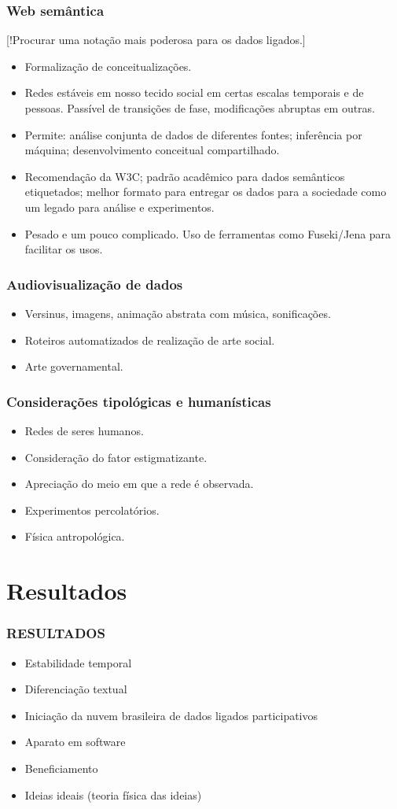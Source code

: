 \documentclass[10pt]{beamer}
\begin{document}
\begin{frame}
\frametitle{Web semântica}
[!Procurar uma notação mais poderosa para os dados ligados.]
\begin{itemize}
	\item Formalização de conceitualizações.
	\item Redes estáveis em nosso tecido social em certas escalas temporais e de pessoas.
		Passível de transições de fase, modificações abruptas em outras.
	\item Permite: análise conjunta de dados de diferentes fontes; inferência por máquina; desenvolvimento conceitual compartilhado.
	\item Recomendação da W3C; padrão acadêmico para dados semânticos etiquetados; melhor formato para entregar os dados para a sociedade como um legado para análise e experimentos.
	\item Pesado e um pouco complicado. Uso de ferramentas como Fuseki/Jena para facilitar os usos.
\end{itemize}

\end{frame}
\begin{frame}
\frametitle{Audiovisualização de dados}
\begin{itemize}
	\item Versinus, imagens, animação abstrata com música, sonificações.
	\item Roteiros automatizados de realização de arte social.
	\item Arte governamental.
\end{itemize}
\end{frame}

\begin{frame}
\frametitle{Considerações tipológicas e humanísticas}
\begin{itemize}
	\item Redes de seres humanos.
	\item Consideração do fator estigmatizante.
	\item Apreciação do meio em que a rede é observada.
	\item Experimentos percolatórios.
	\item Física antropológica.
\end{itemize}
\end{frame}

\section{Resultados}
\begin{frame}
\frametitle{RESULTADOS}
\begin{itemize}
	\item Estabilidade temporal
	\item Diferenciação textual
	\item Iniciação da nuvem brasileira de dados ligados participativos
	\item Aparato em software
	\item Beneficiamento
	\item Ideias ideais (teoria física das ideias)
\end{itemize}
\end{frame}
\end{document}
